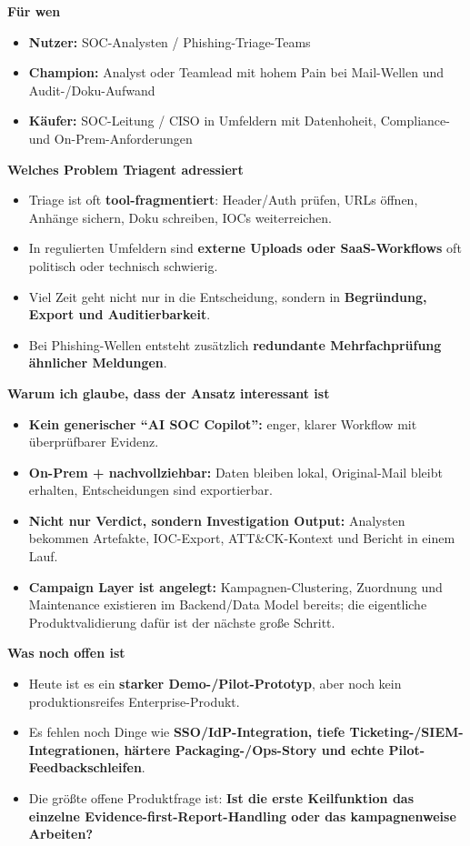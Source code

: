 \documentclass[10pt,a4paper]{article}
\begin{document}
\noindent\textbf{Für wen}
\begin{itemize}
  \item \textbf{Nutzer:} SOC-Analysten / Phishing-Triage-Teams
  \item \textbf{Champion:} Analyst oder Teamlead mit hohem Pain bei Mail-Wellen und Audit-/Doku-Aufwand
  \item \textbf{Käufer:} SOC-Leitung / CISO in Umfeldern mit Datenhoheit, Compliance- und On-Prem-Anforderungen
\end{itemize}

\noindent\textbf{Welches Problem Triagent adressiert}
\begin{itemize}
  \item Triage ist oft \textbf{tool-fragmentiert}: Header/Auth prüfen, URLs öffnen, Anhänge sichern, Doku schreiben, IOCs weiterreichen.
  \item In regulierten Umfeldern sind \textbf{externe Uploads oder SaaS-Workflows} oft politisch oder technisch schwierig.
  \item Viel Zeit geht nicht nur in die Entscheidung, sondern in \textbf{Begründung, Export und Auditierbarkeit}.
  \item Bei Phishing-Wellen entsteht zusätzlich \textbf{redundante Mehrfachprüfung ähnlicher Meldungen}.
\end{itemize}

\noindent\textbf{Warum ich glaube, dass der Ansatz interessant ist}
\begin{itemize}
  \item \textbf{Kein generischer ``AI SOC Copilot'':} enger, klarer Workflow mit überprüfbarer Evidenz.
  \item \textbf{On-Prem + nachvollziehbar:} Daten bleiben lokal, Original-Mail bleibt erhalten, Entscheidungen sind exportierbar.
  \item \textbf{Nicht nur Verdict, sondern Investigation Output:} Analysten bekommen Artefakte, IOC-Export, ATT\&CK-Kontext und Bericht in einem Lauf.
  \item \textbf{Campaign Layer ist angelegt:} Kampagnen-Clustering, Zuordnung und Maintenance existieren im Backend/Data Model bereits; die eigentliche Produktvalidierung dafür ist der nächste große Schritt.
\end{itemize}

\noindent\textbf{Was noch offen ist}
\begin{itemize}
  \item Heute ist es ein \textbf{starker Demo-/Pilot-Prototyp}, aber noch kein produktionsreifes Enterprise-Produkt.
  \item Es fehlen noch Dinge wie \textbf{SSO/IdP-Integration, tiefe Ticketing-/SIEM-Integrationen, härtere Packaging-/Ops-Story und echte Pilot-Feedbackschleifen}.
  \item Die größte offene Produktfrage ist: \textbf{Ist die erste Keilfunktion das einzelne Evidence-first-Report-Handling oder das kampagnenweise Arbeiten?}
\end{itemize}
\end{document}
